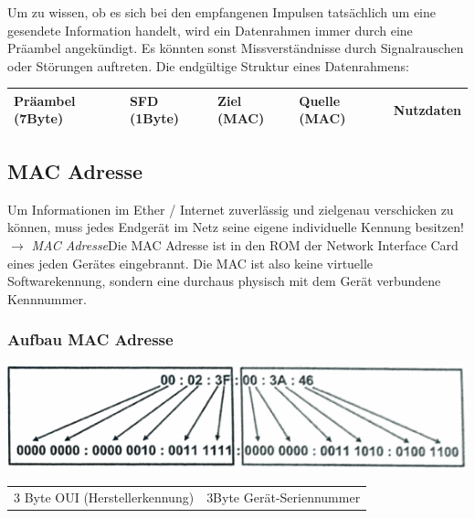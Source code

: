 \documentclass[12pt,a4paper]{article}
\begin{document}
Um zu wissen, ob es sich bei den empfangenen Impulsen tatsächlich um eine gesendete Information handelt, wird ein Datenrahmen immer durch eine Präambel angekündigt. Es könnten sonst Missverständnisse durch Signalrauschen oder Störungen auftreten. Die endgültige Struktur eines Datenrahmens:
\begin{center}
\begin{tabularx}{17cm}{|l|l|X|X|X|}
\hline
Präambel (7Byte)&SFD (1Byte)&Ziel (MAC)&Quelle (MAC)&Nutzdaten\\
\hline
\end{tabularx}
\end{center}
\subsection{MAC Adresse}
Um Informationen im Ether / Internet zuverlässig und zielgenau verschicken zu können, muss jedes Endgerät im Netz seine eigene individuelle Kennung besitzen!\newline $\longrightarrow$ \emph{MAC Adresse}\newline Die MAC Adresse ist in den ROM der Network Interface Card eines jeden Gerätes eingebrannt. Die MAC ist also keine virtuelle Softwarekennung, sondern eine durchaus physisch mit dem Gerät verbundene Kennnummer.
\subsubsection{Aufbau MAC Adresse}
\begin{center}
\includegraphics[scale=1]{Bilder/MAC.png}
\begin{tabularx}{14cm}{XX}
3 Byte OUI (Herstellerkennung)&3Byte Gerät-Seriennummer
\end{tabularx}
\end{center}
\end{document}
